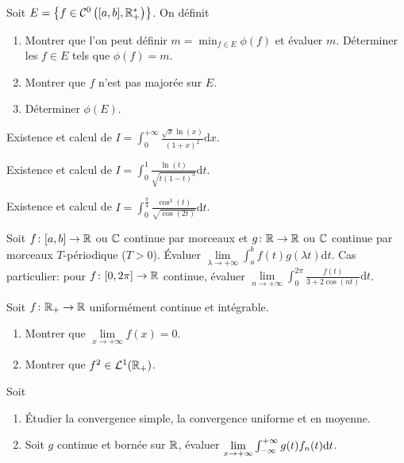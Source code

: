 \documentclass[12pt]{article}
\begin{document}
\begin{exercise}
    Soit $E=\left\lbrace f\in\mathcal{C}^{0}\left([a,b],\mathbb{R}_{+}^{*}\right)\right\rbrace$. On définit 
    \begin{enumerate}
        \item Montrer que l'on peut définir $m=\min_{f\in E}\phi(f)$ et évaluer $m$. Déterminer les $f\in E$ tels que $\phi(f)=m$.
        \item Montrer que $f$ n'est pas majorée sur $E$.
        \item Déterminer $\phi(E)$.
    \end{enumerate}
\end{exercise}

\begin{exercise}
    Existence et calcul de $I=\int_{0}^{+\infty}\frac{\sqrt{x}\ln(x)}{(1+x)^{2}}\mathrm{d}x$.
\end{exercise}

\begin{exercise}
    Existence et calcul de $I=\int_{0}^{1}\frac{\ln(t)}{\sqrt{t(1-t)^{3}}}\mathrm{d}t$.
\end{exercise}

\begin{exercise}
    Existence et calcul de $I=\int_{0}^{\frac{\pi}{4}}\frac{\cos^{3}(t)}{\sqrt{\cos(2t)}}\mathrm{d}t$.
\end{exercise}

\begin{exercise}
    Soit $f\colon[a,b]\to\mathbb{R}$ ou $\mathbb{C}$ continue par morceaux et $g\colon\mathbb{R}\to\mathbb{R}$ ou $\mathbb{C}$ continue par morceaux $T$-périodique ($T>0$). Évaluer $\lim\limits_{\lambda\to+\infty}\int_{a}^{b}f(t)g(\lambda t)\mathrm{d}t$. Cas particulier: pour $f\colon[0,2\pi]\to\mathbb{R}$ continue, évaluer $\lim\limits_{n\to+\infty}\int_{0}^{2\pi}\frac{f(t)}{3+2\cos(nt)}\mathrm{d}t$.
\end{exercise}

\begin{exercise}
    Soit $f\colon\mathbb{R}_{+}\to\mathbb{R}$ uniformément continue et intégrable.
    \begin{enumerate}
        \item Montrer que $\lim\limits_{x\to+\infty}f(x)=0$.
        \item Montrer que $f^{2}\in\mathcal{L}^{1}(\mathbb{R}_{+})$.
    \end{enumerate}
\end{exercise}

\begin{exercise}
    Soit 
    \begin{enumerate}
        \item Étudier la convergence simple, la convergence uniforme et en moyenne.
        \item Soit $g$ continue et bornée sur $\mathbb{R}$, évaluer $\lim\limits_{x\to+\infty}\int_{-\infty}^{+\infty}g(t)f_n(t)\mathrm{d} t$.
    \end{enumerate}
\end{exercise}
\end{document}
